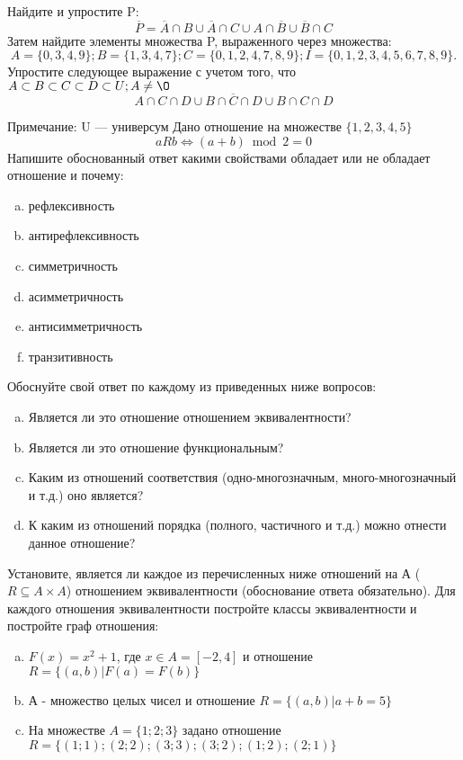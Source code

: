 \documentclass[10pt]{exam}
\begin{document}
\begin{questions}
\question
Найдите и упростите P:
\begin{equation*}
\overline{P} = \overline{A} \cap B \cup \overline{A} \cap C \cup A \cap \overline{B} \cup \overline{B} \cap C
\end{equation*}
Затем найдите элементы множества P, выраженного через множества:
\begin{equation*}
A = \{0, 3, 4, 9\}; 
B = \{1, 3, 4, 7\};
C = \{0, 1, 2, 4, 7, 8, 9\};
I = \{0, 1, 2, 3, 4, 5, 6, 7, 8, 9\}.
\end{equation*}\question
Упростите следующее выражение с учетом того, что $A\subset B \subset C \subset D \subset U; A \neq \O$
\begin{equation*}
A \cap C  \cap D \cup B \cap \overline{C} \cap D \cup B \cap C \cap D
\end{equation*}

Примечание: U — универсум\question
Дано отношение на множестве $\{1, 2, 3, 4, 5\}$ 
\begin{equation*}
aRb \iff (a+b) \bmod 2 =0
\end{equation*}
Напишите обоснованный ответ какими свойствами обладает или не обладает отношение и почему:   
\begin{enumerate} [a)]\setcounter{enumi}{0}
\item рефлексивность
\item антирефлексивность
\item симметричность
\item асимметричность
\item антисимметричность
\item транзитивность
\end{enumerate}

Обоснуйте свой ответ по каждому из приведенных ниже вопросов:
\begin{enumerate} [a)]\setcounter{enumi}{0}
    \item Является ли это отношение отношением эквивалентности?
    \item Является ли это отношение функциональным?
    \item Каким из отношений соответствия (одно-многозначным, много-многозначный и т.д.) оно является?
    \item К каким из отношений порядка (полного, частичного и т.д.) можно отнести данное отношение?
\end{enumerate}



\question
Установите, является ли каждое из перечисленных ниже отношений на А ($R \subseteq A \times A$) отношением эквивалентности (обоснование ответа обязательно). Для каждого отношения эквивалентности постройте классы эквивалентности и постройте граф отношения:
\begin{enumerate} [a)]\setcounter{enumi}{0}
\item $F(x)=x^{2}+1$, где $x \in A = [-2, 4]$ и отношение $R = \{(a,b)|F(a) = F(b)\}$
\item А - множество целых чисел и отношение $R = \{(a,b)|a + b = 5\}$
\item На множестве $A = \{1; 2; 3\}$ задано отношение $R = \{(1; 1); (2; 2); (3; 3); (3; 2); (1; 2); (2; 1)\}$


\end{enumerate}
\end{questions}
\end{document}
